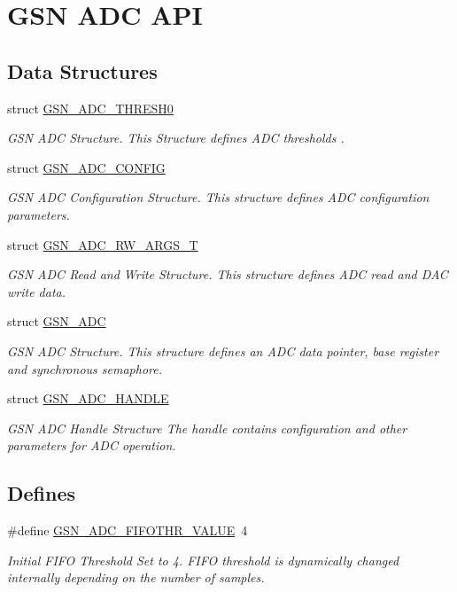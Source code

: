\hypertarget{a00643}{
\section{GSN ADC API}
\label{a00643}
}
\subsection*{Data Structures}
\begin{DoxyCompactItemize}
\item 
struct \hyperlink{a00026}{GSN\_\-ADC\_\-THRESH0}
\begin{DoxyCompactList}\small\item\em GSN ADC Structure. This Structure defines ADC thresholds . \end{DoxyCompactList}\item 
struct \hyperlink{a00023}{GSN\_\-ADC\_\-CONFIG}
\begin{DoxyCompactList}\small\item\em GSN ADC Configuration Structure. This structure defines ADC configuration parameters. \end{DoxyCompactList}\item 
struct \hyperlink{a00025}{GSN\_\-ADC\_\-RW\_\-ARGS\_\-T}
\begin{DoxyCompactList}\small\item\em GSN ADC Read and Write Structure. This structure defines ADC read and DAC write data. \end{DoxyCompactList}\item 
struct \hyperlink{a00022}{GSN\_\-ADC}
\begin{DoxyCompactList}\small\item\em GSN ADC Structure. This structure defines an ADC data pointer, base register and synchronous semaphore. \end{DoxyCompactList}\item 
struct \hyperlink{a00024}{GSN\_\-ADC\_\-HANDLE}
\begin{DoxyCompactList}\small\item\em GSN ADC Handle Structure The handle contains configuration and other parameters for ADC operation. \end{DoxyCompactList}\end{DoxyCompactItemize}
\subsection*{Defines}
\begin{DoxyCompactItemize}
\item 
\#define \hyperlink{a00643_ga757ecde6d25c53dab837e48c83a16b46}{GSN\_\-ADC\_\-FIFOTHR\_\-VALUE}~4
\begin{DoxyCompactList}\small\item\em Initial FIFO Threshold Set to 4. FIFO threshold is dynamically changed internally depending on the number of samples. \end{DoxyCompactList}\end{DoxyCompactItemize}
